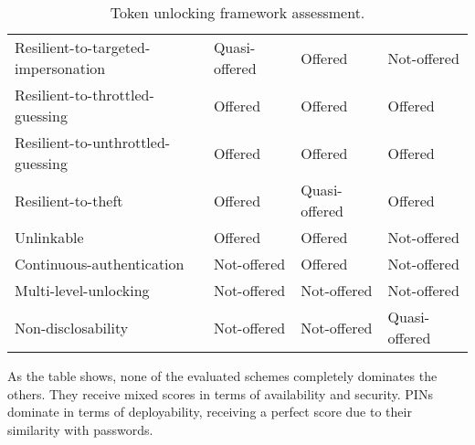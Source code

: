 \begin{table}
\begin{tabular}{l|l|l|l}
    Resilient-to-targeted-impersonation & \cellcolor{yellow!25}Quasi-offered & \cellcolor{green!25}Offered       & \cellcolor{red!25}Not-offered      \\
    Resilient-to-throttled-guessing     & \cellcolor{green!25}Offered       & \cellcolor{green!25}Offered       & \cellcolor{green!25}Offered          \\
    Resilient-to-unthrottled-guessing   & \cellcolor{green!25}Offered       & \cellcolor{green!25}Offered       & \cellcolor{green!25}Offered          \\
    Resilient-to-theft                  & \cellcolor{green!25}Offered       & \cellcolor{yellow!25}Quasi-offered   & \cellcolor{green!25}Offered          \\
    Unlinkable                          & \cellcolor{green!25}Offered       & \cellcolor{green!25}Offered       & \cellcolor{red!25}Not-offered      \\
    Continuous-authentication           & \cellcolor{red!25}Not-offered   & \cellcolor{green!25}Offered       & \cellcolor{red!25}Not-offered      \\
    Multi-level-unlocking               & \cellcolor{red!25}Not-offered   & \cellcolor{red!25}Not-offered   & \cellcolor{red!25}Not-offered      \\
    Non-disclosability                  & \cellcolor{red!25}Not-offered   & \cellcolor{red!25}Not-offered   & \cellcolor{yellow!25}Quasi-offered    \\
    \end{tabular}

	\caption{Token unlocking framework assessment.}
	\label{table:results}

\end{table}

As the table shows, none of the evaluated schemes completely dominates the others. They receive mixed scores in terms of availability and security. PINs dominate in terms of deployability, receiving a perfect score due to their similarity with passwords. 